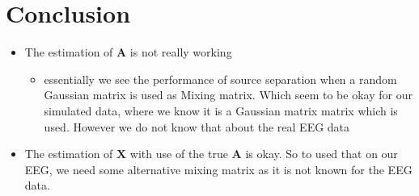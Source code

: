 \section{Conclusion}
\begin{itemize}
\item The estimation of $\textbf{A}$ is not really working
		\begin{itemize}
		\item essentially we see the performance of source separation when a random Gaussian matrix is used as Mixing matrix. Which seem to be okay for our simulated data, where we know it is a Gaussian matrix matrix which is used. However we do not know that about the real EEG data   
\end{itemize}		 
\item The estimation of $\textbf{X}$ with use of the true $\textbf{A}$ is okay. So to used that on our EEG, we need some alternative mixing matrix as it is not known for the EEG data. 
\end{itemize}

